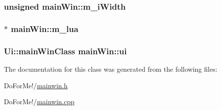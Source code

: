 \hypertarget{classmain_win_a698988f67b0f686dba0a8e33187f66a1}{
\subsubsection[{m\-\_\-i\-Width}]{\setlength{\rightskip}{0pt plus 5cm}unsigned main\-Win\-::m\-\_\-i\-Width\hspace{0.3cm}{\ttfamily [private]}}}\label{classmain_win_a698988f67b0f686dba0a8e33187f66a1}
\hypertarget{classmain_win_a96b71dd9a31a4cf6ea5db224a4540458}{
\subsubsection[{m\-\_\-lua}]{$\ast$ main\-Win\-::m\-\_\-lua\hspace{0.3cm}{\ttfamily [private]}}}\label{classmain_win_a96b71dd9a31a4cf6ea5db224a4540458}
\hypertarget{classmain_win_a89fa9d3006573378f3195845fe9ed408}{
\subsubsection[{ui}]{\setlength{\rightskip}{0pt plus 5cm}Ui\-::main\-Win\-Class main\-Win\-::ui\hspace{0.3cm}{\ttfamily [private]}}}\label{classmain_win_a89fa9d3006573378f3195845fe9ed408}


The documentation for this class was generated from the following files\-:\begin{DoxyCompactItemize}
\item 
Do\-For\-Me!/\hyperlink{mainwin_8h}{mainwin.\-h}\item 
Do\-For\-Me!/\hyperlink{mainwin_8cpp}{mainwin.\-cpp}\end{DoxyCompactItemize}
